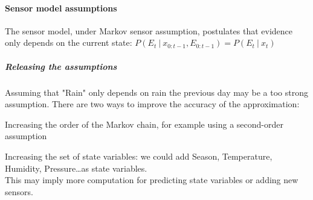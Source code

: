 \documentclass[10pt]{report}
\begin{document}
\paragraph{Sensor model assumptions} The sensor model, under Markov sensor assumption, postulates that evidence only depends on the current state: $P(E_t\:|\:x_{0:t-1},E_{0:t-1})=P(E_t\:|\:x_t)$
\subparagraph{Releasing the assumptions} Assuming that "Rain" only depends on rain the previous day may be a too strong assumption. There are two ways to improve the accuracy of the approximation:
\begin{list}{}{}
	\item Increasing the order of the Markov chain, for example using a second-order assumption
	\item Increasing the set of state variables: we could add Season, Temperature, Humidity, Pressure\ldots as state variables.\\
	This may imply more computation for predicting state variables or adding new sensors.
\end{list}
\end{document}

